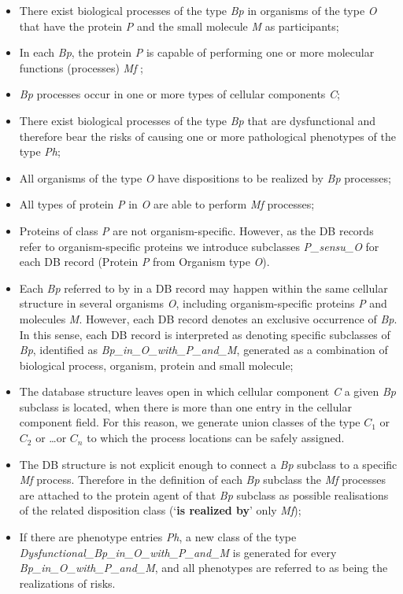 \begin{itemize}
	\item There exist biological processes of the type \textit{Bp} in organisms of the type \textit{O} that have the protein \textit{P} and the small molecule \textit{M} as participants;
	\item In each \textit{Bp}, the protein \textit{P} is capable of performing one or more molecular functions (processes) \textit{Mf} ;
	\item \textit{Bp} processes  occur in one or more types of cellular components \textit{C};
	\item There exist biological processes of the type \textit{Bp} that are dysfunctional and therefore bear the risks of causing one or more pathological phenotypes of the type \textit{Ph};
	\item All organisms of the type \textit{O} have dispositions to be realized by \textit{Bp} processes;
	\item All types of protein \textit{P} in \textit{O} are able to perform \textit{Mf} processes;
	\item Proteins of class \textit{P} are not organism-specific. However, as the DB records refer to organism-specific proteins we introduce subclasses \textit{P\_sensu\_O} for each DB record (Protein \textit{P} from Organism type \textit{O}).
	\item Each \textit{Bp} referred to by in a DB record may happen within the same cellular structure in several organisms \textit{O}, including organism-specific proteins \textit{P} and molecules \textit{M}. However, each DB record denotes an exclusive occurrence of \textit{Bp}. In this sense, each DB record is interpreted as denoting specific subclasses of \textit{Bp}, identified as \textit{Bp\_in\_O\_with\_P\_and\_M}, generated as a combination of biological process, organism, protein and small molecule; 
	\item The database structure leaves open in which cellular component \textit{C} a given \textit{Bp} subclass is located, when there is more than one entry in the cellular component field. For this reason, we generate union classes of the type $C_1$ or $C_2$ or \ldots or $C_n$ to which the process locations can be safely assigned.
	\item The DB structure is not explicit enough to connect a \textit{Bp} subclass to a specific \textit{Mf} process. Therefore in the definition of each \textit{Bp} subclass the \textit{Mf} processes are attached to the protein agent of that \textit{Bp} subclass as possible realisations of the related disposition class (`\textbf{is realized by}' only \textit{Mf}); 
	\item If there are phenotype entries \textit{Ph}, a new class of the type \textit{Dysfunctional\_Bp\_in\_O\_with\_P\_and\_M} is generated for every \textit{ Bp\_in\_O\_with\_P\_and\_M}, and all phenotypes are referred to as being the realizations of risks.
\end{itemize}

